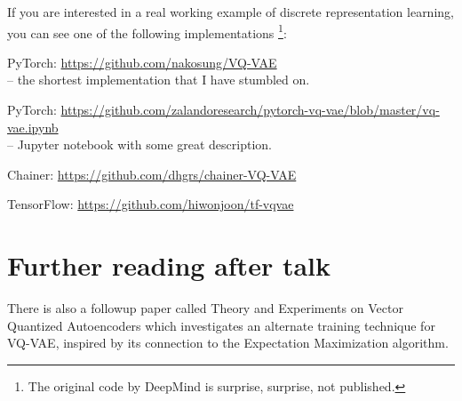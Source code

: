 \documentclass{article}
\begin{document}
If you are interested in a real working example of discrete representation learning, you can see one of the following implementations \footnote{The original code by DeepMind is surprise, surprise, not published.}:
\begin{description}
	\item{PyTorch:} \href{https://github.com/nakosung/VQ-VAE}{https://github.com/nakosung/VQ-VAE} \\-- the shortest implementation that I have stumbled on.
	\item{PyTorch:} \href{https://github.com/zalandoresearch/pytorch-vq-vae/blob/master/vq-vae.ipynb}{https://github.com/zalandoresearch/pytorch-vq-vae/blob/master/vq-vae.ipynb}\\-- Jupyter notebook with some great description.
	\item{Chainer:} \href{https://github.com/dhgrs/chainer-VQ-VAE}{https://github.com/dhgrs/chainer-VQ-VAE}
	\item{TensorFlow:} \href{https://github.com/hiwonjoon/tf-vqvae}{https://github.com/hiwonjoon/tf-vqvae}
\end{description}

\section{Further reading after talk}
There is also a followup paper called Theory and Experiments on Vector Quantized Autoencoders\cite{roy2018theory} which investigates an alternate training technique for VQ-VAE, inspired by its connection to the Expectation Maximization algorithm.

\clearpage
{}

\end{document}
